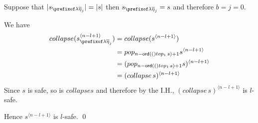 \documentclass[a4paper]{article}
\theoremstyle{remark}
\theoremstyle{definition}
\begin{document}
Suppose that $|s_{\prefixof \lambda\overline\eta_j}|=|s|$ then $s_{\prefixof \lambda\overline\eta_j}=s$ and therefore $b=j=0$.

We have
\begin{align*}
  collapse(s_{\prefixof \lambda\overline\eta_j}^{\langle n-l+1\rangle})
  &= collapse(s^{\langle n-l+1\rangle}) \\
  &= pop_{n-\ord(top_1\, s)+1} s^{\langle n-l+1\rangle} \\
  &= (pop_{n-\ord(top_1\, s)+1} s)^{\langle n-l+1\rangle} \\
  &= (collapse\, s)^{\langle n-l+1\rangle}
\end{align*}
Since $s$ is safe, so is $collapse s$ and therefore by the I.H.,
$(collapse\, s)^{\langle n-l+1\rangle}$ is $l$-safe.

Hence $s^{\langle n-l+1 \rangle}$ is $l$-safe. \qed
\smallskip
\end{document}
